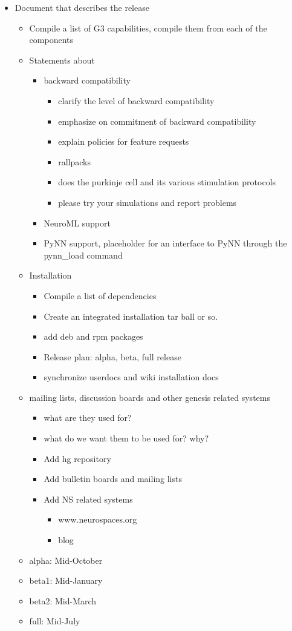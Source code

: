 \documentclass[12pt]{article}
\begin{document}
\begin{itemize}
\item Document that describes the release
\begin{itemize}
\item Compile a list of G3 capabilities, compile them from each of the components
\item Statements about
\begin{itemize}
\item backward compatibility
\begin{itemize}
\item clarify the level of backward compatibility 
\item emphasize on commitment of backward compatibility
\item explain policies for feature requests
\item rallpacks
\item does the purkinje cell and its various stimulation protocols
\item please try your simulations and report problems
\end{itemize}
\item NeuroML support
\item PyNN support, placeholder for an interface to PyNN through the
  pynn\_load command
\end{itemize}
\item Installation
\begin{itemize}
\item Compile a list of dependencies
\item Create an integrated installation tar ball or so.
\item add deb and rpm packages
\item Release plan: alpha, beta, full release
\item synchronize userdocs and wiki installation docs
\end{itemize}
\item mailing lists, discussion boards and other genesis related systems
\begin{itemize}
\item what are they used for?
\item what do we want them to be used for? why?
\item Add hg repository
\item Add bulletin boards and mailing lists
\item Add NS related systems
\begin{itemize}
\item www.neurospaces.org
\item blog
\end{itemize}
\end{itemize}
\item alpha: Mid-October
\item beta1: Mid-January
\item beta2: Mid-March
\item full: Mid-July
\end{itemize}
\end{itemize}
\end{document}
